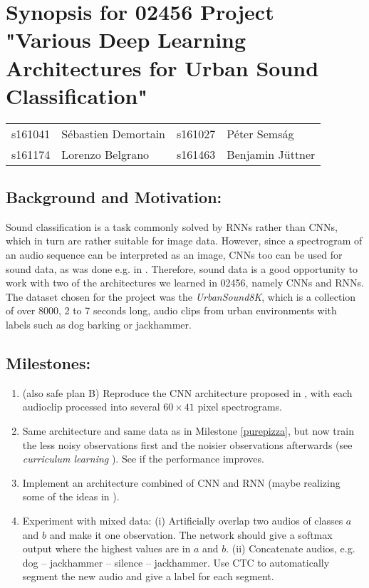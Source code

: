 \documentclass[utf-8]{article}
\newcommand{\urb}{\textit{UrbanSound8K}}
\begin{document}
\section*{Synopsis for 02456 Project "Various Deep Learning Architectures for Urban Sound Classification"}
\begin{tabular}{ll|ll}
s161041 &Sébastien Demortain &s161027 &Péter Semság\\
 s161174 &Lorenzo Belgrano &s161463 &Benjamin Jüttner
\end{tabular}

\subsection*{Background and Motivation:}
Sound classification is a task commonly solved by RNNs rather than CNNs, which in turn are rather suitable for image data. However, since a spectrogram of an audio sequence can be interpreted as an image, CNNs too can be used for sound data, as was done e.g. in \cite{pizza}. Therefore, sound data is a good opportunity to work with two of the architectures we learned in 02456, namely CNNs and RNNs. The dataset chosen for the project was the \urb\cite{urban}, which is a collection of over 8000, 2 to 7 seconds long, audio clips from urban environments with labels such as dog barking or jackhammer.  

\subsection*{Milestones:} %
\begin{enumerate}
\item (also safe plan B) Reproduce the CNN architecture proposed in \cite{pizza}, with each audioclip processed into several $60\times41$ pixel spectrograms.\label{purepizza}
\item Same architecture and same data as in Milestone \ref{purepizza}, but now train the less noisy observations first and the noisier observations afterwards (see \textit{curriculum learning} \cite{curr}). See if the performance improves.
\item Implement an architecture combined of CNN and RNN (maybe realizing some of the ideas in \cite{deepspeech}).\label{cnnrnn} %
\item %
Experiment with mixed data:
(i) Artificially overlap two audios of classes $a$ and $b$ and make it one observation. The network should give a softmax output where the highest values are in $a$ and $b$.  
(ii) Concatenate audios, e.g. dog -- jackhammer -- silence -- jackhammer. Use CTC\cite{ctc, ctctf} to  automatically segment the new audio and give a label for each segment.  
\end{enumerate}
\end{document}
